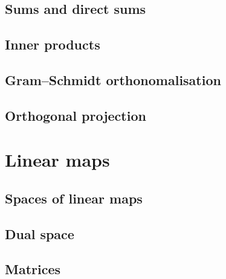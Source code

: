 \documentclass[letter-paper]{tufte-book}
\begin{document}

\section{Sums and direct sums}


\section{Inner products}


\section{Gram--Schmidt orthonomalisation}


\section{Orthogonal projection}


\chapter{Linear maps}


\section{Spaces of linear maps}


\section{Dual space}


\section{Matrices}
\end{document}
